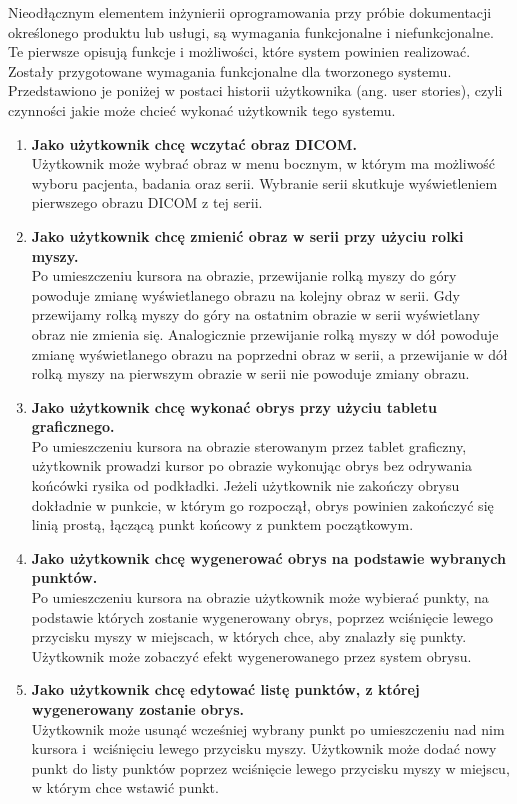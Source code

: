 \documentclass[a4paper,11pt,twoside,openright]{report}
\theoremstyle{definition}
\begin{document}
Nieodłącznym elementem inżynierii oprogramowania przy próbie dokumentacji
określonego produktu lub usługi, są wymagania funkcjonalne i niefunkcjonalne.
Te pierwsze opisują funkcje i możliwości, które system powinien realizować.
Zostały przygotowane wymagania funkcjonalne dla tworzonego systemu. Przedstawiono
je poniżej w postaci historii użytkownika (ang. user stories), czyli czynności
jakie może chcieć wykonać użytkownik tego systemu.
\begin{enumerate}
\item \textbf {Jako użytkownik chcę wczytać obraz DICOM.} \\
Użytkownik może wybrać obraz w menu bocznym, w którym ma możliwość wyboru pacjenta,
badania oraz serii. Wybranie serii skutkuje wyświetleniem pierwszego obrazu DICOM z tej serii.

\item \textbf {Jako użytkownik chcę zmienić obraz w serii przy użyciu rolki myszy.} \\
Po umieszczeniu kursora na obrazie, przewijanie rolką myszy do góry powoduje zmianę
wyświetlanego obrazu na kolejny obraz w serii. Gdy przewijamy rolką myszy do góry
na ostatnim obrazie w serii wyświetlany obraz nie zmienia się. Analogicznie
przewijanie rolką myszy w dół powoduje zmianę wyświetlanego obrazu na poprzedni
obraz w serii, a przewijanie w dół rolką myszy na pierwszym obrazie w serii nie
powoduje zmiany obrazu.

\item \textbf {Jako użytkownik chcę wykonać obrys przy użyciu tabletu graficznego.} \\
Po umieszczeniu kursora na obrazie sterowanym przez tablet graficzny, użytkownik
prowadzi kursor po obrazie wykonując obrys bez odrywania końcówki rysika od podkładki.
Jeżeli użytkownik nie zakończy obrysu dokładnie w punkcie, w którym go rozpoczął,
obrys powinien zakończyć się linią prostą, łączącą punkt końcowy z punktem początkowym.

\item \textbf {Jako użytkownik chcę wygenerować obrys na podstawie wybranych punktów.} \\
Po umieszczeniu kursora na obrazie użytkownik może wybierać punkty, na podstawie
których zostanie wygenerowany obrys, poprzez wciśnięcie lewego przycisku myszy w
miejscach, w których chce, aby znalazły się punkty. Użytkownik może zobaczyć efekt
wygenerowanego przez system obrysu.

\item \textbf {Jako użytkownik chcę edytować listę punktów, z której wygenerowany zostanie obrys.} \\
Użytkownik może usunąć wcześniej wybrany punkt po umieszczeniu nad nim kursora i~wciśnięciu 
lewego przycisku myszy. Użytkownik może dodać nowy punkt do listy punktów
poprzez wciśnięcie lewego przycisku myszy w miejscu, w którym chce wstawić punkt.


\end{enumerate}
\end{document}
